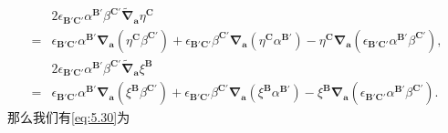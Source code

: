 \begin{equation*}
	\begin{aligned}
		& 2\epsilon _{\boldsymbol{B} '\boldsymbol{C} '} \alpha ^{\boldsymbol{B} '} \beta ^{\boldsymbol{C} '}\tilde{\boldsymbol{\nabla }}_{\boldsymbol{a}} \eta ^{\boldsymbol{C}}\\
		= & \epsilon _{\boldsymbol{B} '\boldsymbol{C} '} \alpha ^{\boldsymbol{B} '}\boldsymbol{\nabla }_{\boldsymbol{a}} (\eta ^{\boldsymbol{C}} \beta ^{\boldsymbol{C} '} )+\epsilon _{\boldsymbol{B} '\boldsymbol{C} '} \beta ^{\boldsymbol{C} '}\boldsymbol{\nabla }_{\boldsymbol{a}} (\eta ^{\boldsymbol{C}} \alpha ^{\boldsymbol{B} '} )-\eta ^{\boldsymbol{C}}\boldsymbol{\nabla }_{\boldsymbol{a}} (\epsilon _{\boldsymbol{B} '\boldsymbol{C} '} \alpha ^{\boldsymbol{B} '} \beta ^{\boldsymbol{C} '} ),\\
		& 2\epsilon _{\boldsymbol{B} '\boldsymbol{C} '} \alpha ^{\boldsymbol{B} '} \beta ^{\boldsymbol{C} '}\tilde{\boldsymbol{\nabla }}_{\boldsymbol{a}} \xi ^{\boldsymbol{B}}\\
		= & \epsilon _{\boldsymbol{B} '\boldsymbol{C} '} \alpha ^{\boldsymbol{B} '}\boldsymbol{\nabla }_{\boldsymbol{a}} (\xi ^{\boldsymbol{B}} \beta ^{\boldsymbol{C} '} )+\epsilon _{\boldsymbol{B} '\boldsymbol{C} '} \beta ^{\boldsymbol{C} '}\boldsymbol{\nabla }_{\boldsymbol{a}} (\xi ^{\boldsymbol{B}} \alpha ^{\boldsymbol{B} '} )-\xi ^{\boldsymbol{B}}\boldsymbol{\nabla }_{\boldsymbol{a}} (\epsilon _{\boldsymbol{B} '\boldsymbol{C} '} \alpha ^{\boldsymbol{B} '} \beta ^{\boldsymbol{C} '}) .
	\end{aligned}
\end{equation*}
那么我们有\ref{eq:5.30}为

